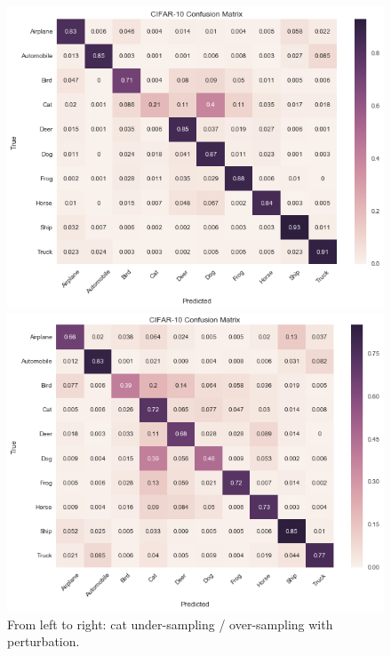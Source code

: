 \documentclass[runningheads,a4paper]{llncs}
\begin{document}
\begin{figure}
	\begin{minipage}[b]{0.55\linewidth}
		\centering
		\includegraphics[width=1\linewidth]{cat_undersampling_per.png} 
	\end{minipage}%
	\begin{minipage}[b]{0.55\linewidth}
		\centering
		\includegraphics[width=1\linewidth]{cat_oversampling_per.png} 
	\end{minipage}
	\centering
	\caption{From left to right: cat under-sampling / over-sampling with perturbation.}
	\label{fig:overlap}
\end{figure}
\end{document}
